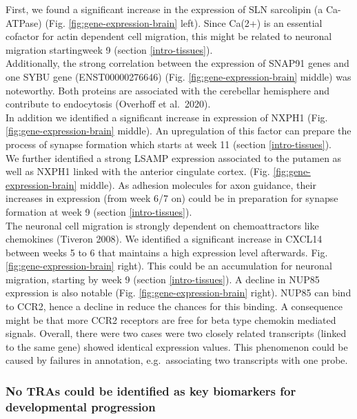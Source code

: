 \documentclass[
]{article}
\begin{document}
First, we found a significant increase in the expression of SLN sarcolipin (a Ca-ATPase) (Fig. \ref{fig:gene-expression-brain} left). Since Ca(2+) is an essential cofactor for actin dependent cell migration, this might be related to neuronal migration startingweek 9 (section \ref{intro-tissues}).\\
Additionally, the strong correlation between the expression of SNAP91 genes and one SYBU gene (ENST00000276646) (Fig. \ref{fig:gene-expression-brain} middle) was noteworthy. Both proteins are associated with the cerebellar hemisphere and contribute to endocytosis (Overhoff et al.~2020).\\
In addition we identified a significant increase in expression of NXPH1 (Fig. \ref{fig:gene-expression-brain} middle). An upregulation of this factor can prepare the process of synapse formation which starts at week 11 (section \ref{intro-tissues}).\\
We further identified a strong LSAMP expression associated to the putamen as well as NXPH1 linked with the anterior cingulate cortex. (Fig. \ref{fig:gene-expression-brain} middle). As adhesion molecules for axon guidance, their increases in expression (from week 6/7 on) could be in preparation for synapse formation at week 9 (section \ref{intro-tissues}).\\
The neuronal cell migration is strongly dependent on chemoattractors like chemokines (Tiveron 2008). We identified a significant increase in CXCL14 between weeks 5 to 6 that maintains a high expression level afterwards. Fig. \ref{fig:gene-expression-brain} right). This could be an accumulation for neuronal migration, starting by week 9 (section \ref{intro-tissues}). A decline in NUP85 expression is also notable (Fig. \ref{fig:gene-expression-brain} right). NUP85 can bind to CCR2, hence a decline in reduce the chances for this binding. A consequence might be that more CCR2 receptors are free for beta type chemokin mediated signals.
Overall, there were two cases were two closely related transcripts (linked to the same gene) showed identical expression values. This phenomenon could be caused by failures in annotation, e.g.~associating two transcripts with one probe.

\hypertarget{dis-pca}{%
\subsubsection{No TRAs could be identified as key biomarkers for developmental progression}\label{dis-pca}}
\end{document}
